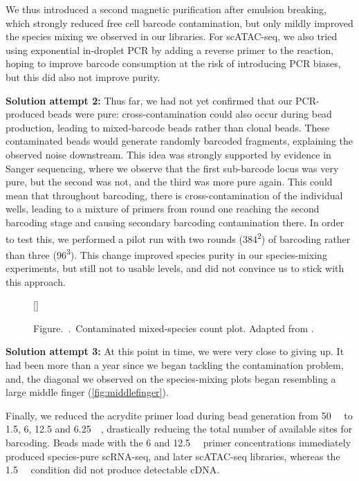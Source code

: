 We thus introduced a second magnetic purification after emulsion breaking, which strongly reduced free cell barcode contamination, but only mildly improved the species mixing we observed in our libraries. For scATAC-seq, we also tried using exponential in-droplet PCR by adding a reverse primer to the reaction, hoping to improve barcode consumption at the risk of introducing PCR biases, but this did also not improve purity.

\textbf{Solution attempt 2:} Thus far, we had not yet confirmed that our PCR-produced beads were pure: cross-contamination could also occur during bead production, leading to mixed-barcode beads rather than clonal beads. These contaminated beads would generate randomly barcoded fragments, explaining the observed noise downstream. This idea was strongly supported by evidence in Sanger sequencing, where we observe that the first sub-barcode locus was very pure, but the second was not, and the third was more pure again. This could mean that throughout barcoding, there is cross-contamination of the individual wells, leading to a mixture of primers from round one reaching the second barcoding stage and causing secondary barcoding contamination there. In order to test this, we performed a pilot run with two rounds (384\textsuperscript{2}) of barcoding rather than three (96\textsuperscript{3}). This change improved species purity in our species-mixing experiments, but still not to usable levels, and did not convince us to stick with this approach.

\setcounter{figure}{\value{figure}}
\begin{figure}
	\centering
	\raisebox{0pt}[\dimexpr{}\baselineskip\relax]{%
		
	}
	\caption*{\captionlabelfont Figure.~\thefigure.~\normalfont Contaminated mixed-species count plot. Adapted from .}
	\label{fig:middlefinger}
\end{figure}

\textbf{Solution attempt 3:} At this point in time, we were very close to giving up. It had been more than a year since we began tackling the contamination problem, and, the diagonal we observed on the species-mixing plots began resembling a large middle finger (\autoref{fig:middlefinger}).

Finally, we reduced the acrydite primer load during bead generation from \SI{50}{\micro\molar} to \num{1.5}, \num{6}, \num{12.5} and \SI{6.25}{\micro\molar}, drastically reducing the total number of available sites for barcoding. Beads made with the 6 and \SI{12.5}{\micro\molar} primer concentrations immediately produced species-pure scRNA-seq, and later scATAC-seq libraries, whereas the \SI{1.5}{\micro\molar} condition did not produce detectable cDNA.

